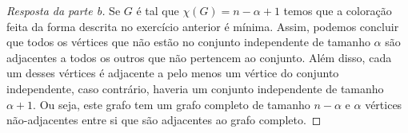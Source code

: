 \documentclass[12pt]{article}
\begin{document}
\begin{proof}[Resposta da parte b]
Se $G$ é tal que $\chi(G) = n - \alpha + 1$ temos que a coloração feita da forma descrita no exercício anterior é mínima. Assim, podemos concluir que todos os vértices que não estão no conjunto independente de tamanho $\alpha$ são adjacentes a todos os outros que não pertencem ao conjunto. Além disso, cada um desses vértices é adjacente a pelo menos um vértice do conjunto independente, caso contrário, haveria um conjunto independente de tamanho $\alpha + 1$. Ou seja, este grafo tem um grafo completo de tamanho $n - \alpha$ e $\alpha$ vértices não-adjacentes entre si que são adjacentes ao grafo completo. 
\end{proof}
\end{document}
